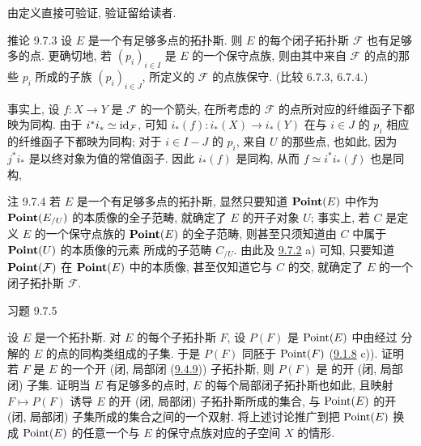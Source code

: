 由定义直接可验证, 验证留给读者.

\begin{enonce*}{推论 9.7.3}
设 $E$ 是一个有足够多点的拓扑斯.
则 $E$ 的每个闭子拓扑斯 $\mathcal{F}$ 也有足够多的点.
更确切地, 若 $(p_i)_{i\in I}$ 是 $E$ 的一个保守点族,
则由其中来自 $\mathcal{F}$ 的点的那些 $p_i$ 所成的子族 $(p_i)_{i\in J}$,
所定义的 $\mathcal{F}$ 的点族保守.
(比较 $\hyperref[IV.cor6.7.3]{6.7.3}$, $\hyperref[IV.rem6.7.4]{6.7.4}$.)
\end{enonce*}

事实上, 设 $f:X\rightarrow Y$ 是 $\mathcal{F}$ 的一个箭头,
在所考虑的 $\mathcal{F}$ 的点所对应的纤维函子下都映为同构.
由于 $i^{\ast}i_{\ast}\simeq\operatorname{id}_{\mathcal{F}}$,
可知 $i_{\ast}(f):i_{\ast}(X)\rightarrow i_{\ast}(Y)$
在与 $i\in J$ 的 $p_i$ 相应的纤维函子下都映为同构;
对于 $i\in I-J$ 的 $p_i$, \ie 来自 $U$ 的那些点, 也如此,
因为 $j^{\ast}i_{\ast}$ 是以终对象为值的常值函子.
因此 $i_{\ast}(f)$ 是同构,
从而 $f\simeq i^{\ast}i_{\ast}(f)$ 也是同构, \cqfd

\begin{enonce*}[remark]{注 9.7.4}
若 $E$ 是一个有足够多点的拓扑斯,
显然只要知道 $\operatorname{\mathbf{Point}}(E)$ 中作为 $\operatorname{\mathbf{Point}}(E_{/U})$ 的本质像的全子范畴,
就确定了 $E$ 的开子对象 $U$;
事实上, 若 $C$ 是定义 $E$ 的一个保守点族的 $\operatorname{\mathbf{Point}}(E)$ 的全子范畴,
则甚至只须知道由 $C$ 中属于 $\operatorname{\mathbf{Point}}(U)$ 的本质像的元素
所成的子范畴 $C_{/U}$.
由此及 \hyperref[IV.prop9.7.2]{9.7.2} a) 可知,
只要知道 $\operatorname{\mathbf{Point}}(\mathcal{F})$ 在 $\operatorname{\mathbf{Point}}(E)$ 中的本质像,
甚至仅知道它与 $C$ 的交,
就确定了 $E$ 的一个闭子拓扑斯 $\mathcal{F}$.
\end{enonce*}

\begin{enonce*}[remark]{习题 9.7.5}



设 $E$ 是一个拓扑斯.
对 $E$ 的每个子拓扑斯 $F$,
设 $P(F)$ 是 $\operatorname{Point}(E)$ 中由经过  分解的 $E$ 的点的同构类组成的子集.
于是 $P(F)$ 同胚于 $\operatorname{Point}(F)$ (\hyperref[IV.exer9.1.8]{9.1.8} c)).
证明若 $F$ 是 $E$ 的一个开
(\resp 闭, \resp 局部闭 (\hyperref[IV.exer9.4.9]{9.4.9})) 子拓扑斯,
则 $P(F)$ 是  的开\pageoriginale
(\resp 闭, \resp 局部闭) 子集.
证明当 $E$ 有足够多的点时,
 $E$ 的每个局部闭子拓扑斯也如此,
且映射 $F\mapsto P(F)$
诱导 $E$ 的开 (\resp 闭, \resp 局部闭) 子拓扑斯所成的集合,
与 $\operatorname{Point}(E)$ 的开 (\resp 闭, \resp 局部闭) 子集所成的集合之间的一个双射.
将上述讨论推广到把 $\operatorname{Point}(E)$ 换成 $\operatorname{Point}(E)$ 的任意一个与 $E$ 的保守点族对应的子空间 $X$ 的情形.
\end{enonce*}

